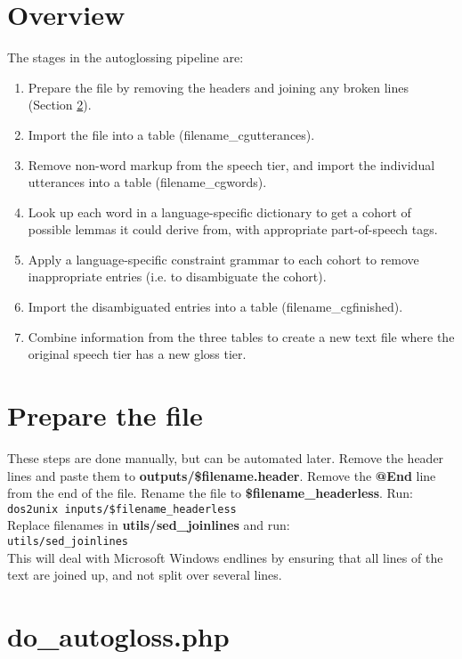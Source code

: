 \documentclass[a4paper,10pt]{article}
\begin{document}
\section{Overview}
\label{sec:overview}

The stages in the autoglossing pipeline are:
\begin{enumerate}
\item Prepare the file by removing the headers and joining any broken lines (Section \ref{sec:prepare}).
\item Import the file into a table (filename\_cgutterances).
\item Remove non-word markup from the speech tier, and import the individual utterances into a table (filename\_cgwords).
\item Look up each word in a language-specific dictionary to get a cohort of possible lemmas it could derive from, with appropriate part-of-speech tags.
\item Apply a language-specific constraint grammar to each cohort to remove inappropriate entries (i.e. to disambiguate the cohort).
\item Import the disambiguated entries into a table (filename\_cgfinished).
\item Combine information from the three tables to create a new text file where the original speech tier has a new gloss tier.
\end{enumerate}




\section{Prepare the file}
\label{sec:prepare}

These steps are done manually, but can be automated later.  Remove the header lines and paste them to \textbf{outputs/\$filename.header}.  Remove the \textbf{@End} line from the end of the file.  Rename the file to \textbf{\$filename\_headerless}.  Run: \\
\verb|dos2unix inputs/$filename_headerless|\\
Replace filenames in \textbf{utils/sed\_joinlines} and run:\\
\verb|utils/sed_joinlines|\\
This will deal with Microsoft Windows endlines by ensuring that all lines of the text are joined up, and not split over several lines.


\section{do\_autogloss.php}
\label{sec:pipeline}
\end{document}
